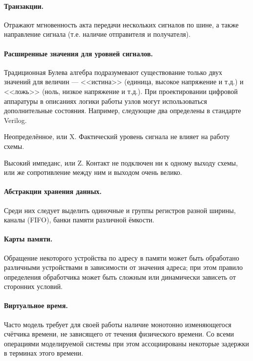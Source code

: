 \paragraph{Транзакции.} Отражают мгновенность акта передачи нескольких сигналов по шине, а также направление сигнала (т.е. наличие отправителя и получателя).

\paragraph{Расширенные значения для уровней сигналов.} Традиционная Булева алгебра подразумевают существование только двух значений для величин --- <<истина>> (единица, высокое напряжение и т.д.) и <<ложь>> (ноль, низкое напряжение и т.д.). При проектировании цифровой аппаратуры в описаниях логики работы узлов могут использоваться дополнительные состояния. Например, следующие два определены в стандарте Verilog.
\begin{enumerate*}
\item Неопределённое, или X. Фактический уровень сигнала не влияет на работу схемы.
\item Высокий импеданс, или Z. Контакт не подключен ни к одному выходу схемы, или же сопротивление между ним и выходом очень велико.
\end{enumerate*}

\paragraph{Абстракции хранения данных.} Среди них следует выделить одиночные и группы регистров разной ширины, каналы (FIFO), банки памяти различной ёмкости.

\paragraph{Карты памяти.} Обращение некоторого устройства по адресу в памяти может быть обработано различными устройствами в зависимости от значения адреса; при этом правило определения обработчика может быть сложным или динамически зависеть от сторонних условий.


\paragraph{Виртуальное время.} Часто модель требует для своей работы наличие монотонно изменяющегося счётчика времени, не зависящего от течения физического времени. Со всеми операциями моделируемой системы при этом ассоциированы некоторые задержки в терминах этого времени.


